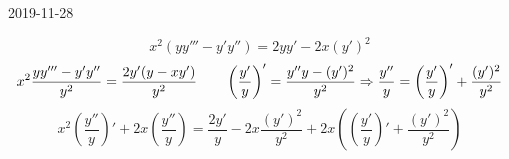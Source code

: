 \documentclass[12pt, fleqn]{article}
\begin{document}
\begin{lect}{2019-11-28}
    \begin{Task}[из дз]
        \[x^2(yy''' - y'y'') = 2yy' - 2x(y')^2\]
        \[x^2 \frac{yy''' - y'y''}{y^2} = \frac{2 y'(y - xy')}{y^2} \qquad \left(\frac{y'}{y}\right)' =
        \frac{y''y - (y')^2}{y^2} \Rightarrow \frac{y''}{y} = \left(\frac{y'}{y}\right)' + \frac{(y')^2}{y^2}\]
        \[x^2 \left(\frac{y''}{y}\right)' + 2x \left(\frac{y''}{y}\right) =
        \frac{2y'}{y} - 2x \frac{(y')^2}{y^2} + 2x \left(\left(\frac{y'}{y}\right)' + \frac{(y')^2}{y^2}\right)\]
    \end{Task}
\end{lect}
\end{document}
